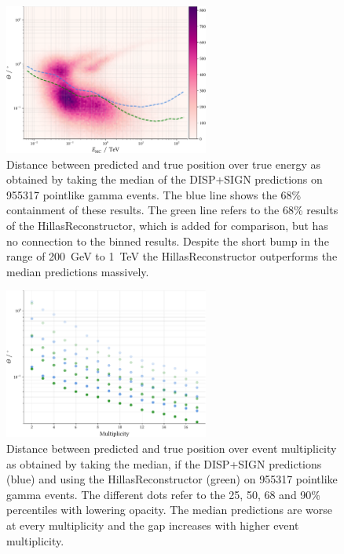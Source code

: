 \begin{figure}
    \centering
    \captionsetup{width=0.9\linewidth}
    \includegraphics[width=0.6\textwidth]{../analysis/plots/gamma/median_vs_energy.pdf} 
    \caption{Distance between predicted and true position over true energy as obtained by taking the median of
    the DISP+SIGN predictions on 955317 pointlike gamma events. The blue line shows the 
    68\% containment of these results. The green line refers to the 68\%
    results of the HillasReconstructor, which is added for comparison, but has no
    connection to the binned results.
    Despite the short bump in the range of \SI{200}{\giga\electronvolt}
    to \SI{1}{\tera\electronvolt} the HillasReconstructor outperforms the median predictions
    massively.}
    \label{fig:stereo_median_energy}
\end{figure}

\begin{figure}
    \centering
    \captionsetup{width=0.9\linewidth}
    \includegraphics[width=0.6\textwidth]{../analysis/plots/gamma/median_vs_multi_comp.pdf}
    \caption{Distance between predicted and true position over event multiplicity as obtained by taking
    the median, if the DISP+SIGN predictions (blue) and using the HillasReconstructor (green)
    on 955317 pointlike gamma events. 
    The different dots refer to the 25, 50, 68 and 90\% percentiles with 
    lowering opacity.
    The median predictions are worse at every multiplicity and the gap increases with higher event multiplicity.}
    \label{fig:stereo_median_multi}
\end{figure}

